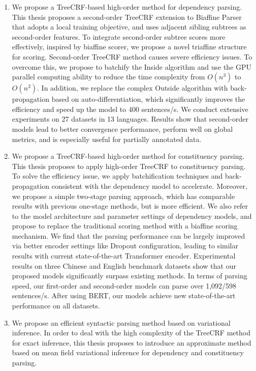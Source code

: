 \begin{eabstract}
	\begin{enumerate}
		\item We propose a TreeCRF-based high-order method for dependency parsing.
		      This thesis proposes a second-order TreeCRF extension to Biaffine Parser that adopts a local training objective, and uses adjacent sibling subtrees as second-order features.
		      To integrate second-order subtree scores more effectively, inspired by biaffine scorer, we propose a novel triaffine structure for scoring.
		      Second-order TreeCRF method causes severe efficiency issues.
		      To overcome this, we propose to batchify the Inside algorithm and use the GPU parallel computing ability to reduce the time complexity from $O(n^3)$ to $O(n^2)$.
		      In addition, we replace the complex Outside algorithm with back-propagation based on auto-differentiation, which significantly improves the efficiency and speed up the model to 400 sentences/s.
		      We conduct extensive experiments on 27 datasets in 13 languages.
		      Results show that second-order models lead to better convergence performance, perform well on global metrics, and is especially useful for partially annotated data.
		\item We propose a TreeCRF-based high-order method for constituency parsing.
		      This thesis proposes to apply high-order TreeCRF to constituency parsing.
		      To solve the efficiency issue, we apply batchification techniques and back-propagation consistent with the dependency model to accelerate.
		      Moreover, we propose a simple two-stage parsing approach, which has comparable results with previous one-stage methods, but is more efficient.
		      We also refer to the model architecture and parameter settings of dependency models, and propose to replace the traditional scoring method with a biaffine scoring mechanism.
		      We find that the parsing performance can be largely improved via better encoder settings like Dropout configuration, leading to similar results with current state-of-the-art Transformer encoder.
		      Experimental results on three Chinese and English benchmark datasets show that our proposed models significantly surpass existing methods.
		      In terms of parsing speed, our first-order and second-order models can parse over 1,092/598 sentences/s.
		      After using BERT, our models achieve new state-of-the-art performance on all datasets.
		\item We propose an efficient syntactic parsing method based on variational inference.
		      In order to deal with the high complexity of the TreeCRF method for exact inference, this thesis proposes to introduce an approximate method based on mean field variational inference for dependency and constituency parsing.

\end{enumerate}
\end{eabstract}
